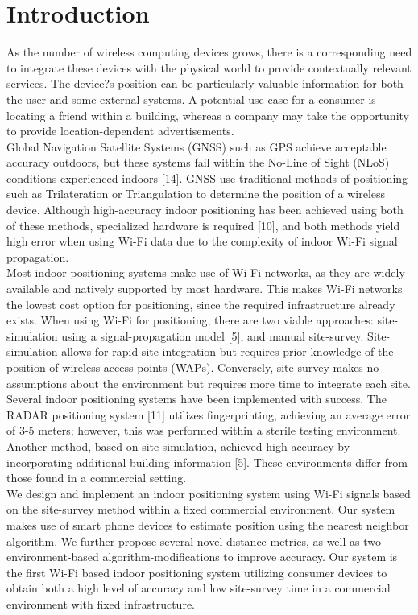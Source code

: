 \documentclass[conference]{IEEEtran}
\begin{document}
\section{Introduction}
As the number of wireless computing devices grows, there is a corresponding need to integrate these devices with the physical world to provide contextually relevant services. The device?s position can be particularly valuable information for both the user and some external systems. A potential use case for a consumer is locating a friend within a building, whereas a company may take the opportunity to provide location-dependent advertisements.\\
\indent Global Navigation Satellite Systems (GNSS) such as GPS achieve acceptable accuracy outdoors, but these systems fail within the No-Line of Sight (NLoS) conditions experienced indoors [14]. GNSS use traditional methods of positioning such as Trilateration or Triangulation to determine the position of a wireless device. Although high-accuracy indoor positioning has been achieved using both of these methods, specialized hardware is required [10], and both methods yield high error when using Wi-Fi data due to the complexity of indoor Wi-Fi signal propagation. \\
\indent Most indoor positioning systems make use of Wi-Fi networks, as they are widely available and natively supported by most hardware. This makes Wi-Fi networks the lowest cost option for positioning, since the required infrastructure already exists. When using Wi-Fi for positioning, there are two viable approaches: site-simulation using a signal-propagation model [5], and manual site-survey. Site-simulation allows for rapid site integration but requires prior knowledge of the position of wireless access points (WAPs). Conversely, site-survey makes no assumptions about the environment but requires more time to integrate each site. \\
\indent Several indoor positioning systems have been implemented with success. The RADAR positioning system [11] utilizes fingerprinting, achieving an average error of 3-5 meters; however, this was performed within a sterile testing environment. Another method, based on site-simulation, achieved high accuracy by incorporating additional building information [5]. These environments differ from those found in a commercial setting.\\
\indent We design and implement an indoor positioning system using Wi-Fi signals based on the site-survey method within a fixed commercial environment. Our system makes use of smart phone devices to estimate position using the nearest neighbor algorithm. We further propose several novel distance metrics, as well as two environment-based algorithm-modifications to improve accuracy. Our system is the first Wi-Fi based indoor positioning system utilizing consumer devices to obtain both a high level of accuracy and low site-survey time in a commercial environment with fixed infrastructure.\\
\end{document}
